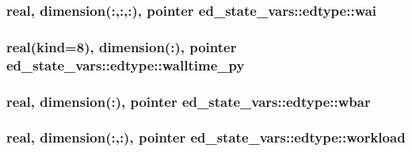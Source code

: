 \subsubsection[{\texorpdfstring{wai}{wai}}]{\setlength{\rightskip}{0pt plus 5cm}real, dimension(\+:,\+:,\+:), pointer ed\+\_\+state\+\_\+vars\+::edtype\+::wai}\hypertarget{structed__state__vars_1_1edtype_aec54ce8ea6b7de382185f26412cfe797}{}\label{structed__state__vars_1_1edtype_aec54ce8ea6b7de382185f26412cfe797}
\subsubsection[{\texorpdfstring{walltime\+\_\+py}{walltime_py}}]{\setlength{\rightskip}{0pt plus 5cm}real(kind=8), dimension(\+:), pointer ed\+\_\+state\+\_\+vars\+::edtype\+::walltime\+\_\+py}\hypertarget{structed__state__vars_1_1edtype_aabf3fdc1e814dd0f13cff71311dc6ae5}{}\label{structed__state__vars_1_1edtype_aabf3fdc1e814dd0f13cff71311dc6ae5}
\subsubsection[{\texorpdfstring{wbar}{wbar}}]{\setlength{\rightskip}{0pt plus 5cm}real, dimension(\+:), pointer ed\+\_\+state\+\_\+vars\+::edtype\+::wbar}\hypertarget{structed__state__vars_1_1edtype_a556f553a989e9df68b67a18cd063ce13}{}\label{structed__state__vars_1_1edtype_a556f553a989e9df68b67a18cd063ce13}
\subsubsection[{\texorpdfstring{workload}{workload}}]{\setlength{\rightskip}{0pt plus 5cm}real, dimension(\+:,\+:), pointer ed\+\_\+state\+\_\+vars\+::edtype\+::workload}\hypertarget{structed__state__vars_1_1edtype_a71730af92d1a6ac06b1d742a445fb9e4}{}\label{structed__state__vars_1_1edtype_a71730af92d1a6ac06b1d742a445fb9e4}

